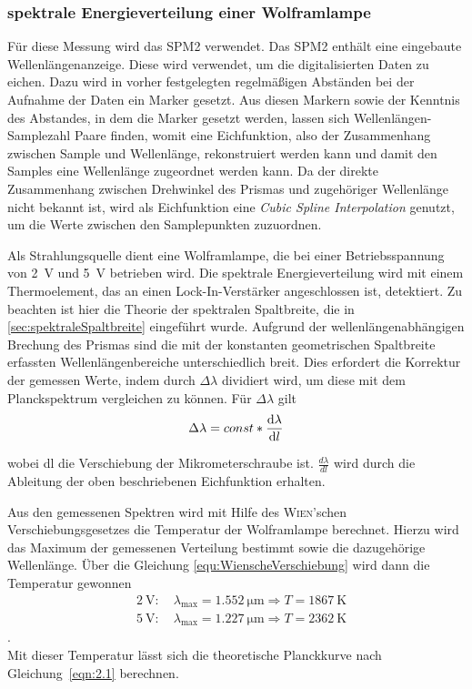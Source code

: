\documentclass[a4paper,twoside,final]{article}
\begin{document}
\subsubsection{spektrale Energieverteilung einer Wolframlampe}\label{par:EichungSPM2}
Für diese Messung wird das SPM2 verwendet. Das SPM2 enthält eine eingebaute Wellenlängenanzeige. Diese wird verwendet, um die digitalisierten Daten zu eichen. Dazu wird in vorher festgelegten regelmäßigen Abständen bei der Aufnahme der Daten ein Marker gesetzt. Aus diesen Markern sowie der Kenntnis des Abstandes, in dem die Marker gesetzt werden, lassen sich Wellenlängen-Samplezahl Paare finden, womit eine Eichfunktion, also der Zusammenhang zwischen Sample und Wellenlänge, rekonstruiert werden kann und damit den Samples eine Wellenlänge zugeordnet werden kann. Da der direkte Zusammenhang zwischen Drehwinkel des Prismas und zugehöriger Wellenlänge nicht bekannt ist, wird als Eichfunktion eine \emph{Cubic Spline Interpolation} genutzt, um die Werte zwischen den Samplepunkten zuzuordnen.

Als Strahlungsquelle dient eine Wolframlampe, die bei einer Betriebsspannung von \SI{2}{V} und \SI{5}{V} betrieben wird. Die spektrale Energieverteilung wird mit einem Thermoelement, das an einen Lock-In-Verstärker angeschlossen ist, detektiert. Zu beachten ist hier die Theorie der spektralen Spaltbreite, die in \ref{sec:spektraleSpaltbreite} eingeführt wurde. Aufgrund der wellenlängenabhängigen Brechung des Prismas sind die mit der konstanten geometrischen Spaltbreite erfassten Wellenlängenbereiche unterschiedlich breit. Dies erfordert die Korrektur der gemessen Werte, indem durch $\Delta \lambda$ dividiert wird, um diese mit dem Planckspektrum vergleichen zu können. Für $\Delta \lambda$ gilt
\begin{align}
  \Delta \lambda = const* \dv{\lambda}{l}
\end{align}

wobei dl die Verschiebung der Mikrometerschraube ist. $\frac{d\lambda}{dl}$ wird durch die Ableitung der oben beschriebenen Eichfunktion erhalten.

Aus den gemessenen Spektren wird mit Hilfe des \textsc{Wien}'schen Verschiebungsgesetzes die Temperatur der Wolframlampe berechnet. Hierzu wird das Maximum der gemessenen Verteilung bestimmt sowie die dazugehörige Wellenlänge. Über die Gleichung \eqref{equ:WienscheVerschiebung} wird dann die Temperatur gewonnen
\begin{align}
  &\SI{2}{\volt}: \quad \lambda_\text{max} = \SI{1.552}{\micro\metre} \Rightarrow T = \SI{1867}{\kelvin}\\
  &\SI{5}{\volt}: \quad \lambda_\text{max} = \SI{1.227}{\micro\metre} \Rightarrow T = \SI{2362}{\kelvin}
\end{align}
. \\
Mit dieser Temperatur lässt sich die theoretische Planckkurve nach Gleichung~\eqref{eqn:2.1} berechnen.
\end{document}
